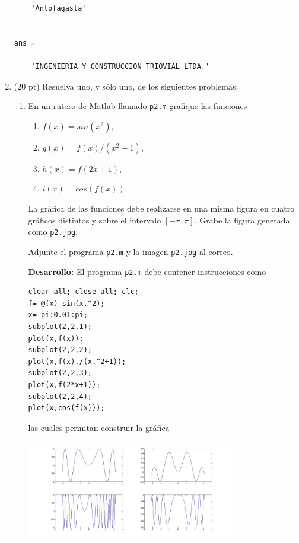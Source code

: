 \documentclass[11pt]{article}
\begin{document}
\begin{enumerate}
\begin{lstlisting}
    'Antofagasta'


ans = 

    'INGENIERIA Y CONSTRUCCION TRIOVIAL LTDA.'

\end{lstlisting}

\newpage
\item (20 pt) Resuelva uno, y sólo uno, de los siguientes problemas.
\begin{enumerate}
\item
En un rutero de Matlab llamado \texttt{p2.m} grafique las funciones
\begin{multicols}{2}
	\begin{enumerate}
    	\item $f(x)=sin(x^2)$,
        \item $g(x)=f(x)/(x^2+1)$,
        \item $h(x)=f(2x+1)$,
        \item $i(x)=cos(f(x))$.
    \end{enumerate}
\end{multicols}
La gr\'afica de las funciones debe realizarse en una misma figura en cuatro gr\'aficos distintos y sobre el intervalo $[-\pi,\pi]$. Grabe la figura generada como \texttt{p2.jpg}.

Adjunte el programa \texttt{p2.m} y la imagen \texttt{p2.jpg} al correo.

\textbf{Desarrollo:} El programa \texttt{p2.m} debe contener instrucciones como
\begin{lstlisting}
clear all; close all; clc;
f= @(x) sin(x.^2);
x=-pi:0.01:pi;
subplot(2,2,1);
plot(x,f(x));
subplot(2,2,2);
plot(x,f(x)./(x.^2+1));
subplot(2,2,3);
plot(x,f(2*x+1));
subplot(2,2,4);
plot(x,cos(f(x)));
\end{lstlisting}
las cuales permitan construir la gr\'afica
\begin{center}
\includegraphics[width=0.75\textwidth]{./p2.jpg}
\end{center}


\end{enumerate}
\end{enumerate}
\end{document}

